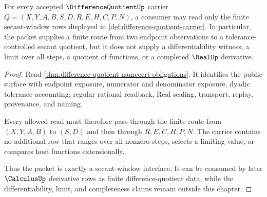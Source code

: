 \begin{theorem}
\label{thm:difference-quotient-finite-window-scope}
For every accepted $\DifferenceQuotientUp$ carrier $Q=(X,Y,A,B,S,D,R,E,H,C,P,N)$, a consumer may read only the finite secant-window rows displayed in \autoref{def:difference-quotient-carrier}. In particular, the packet supplies a finite route from two endpoint observations to a tolerance-controlled secant quotient, but it does not supply a differentiability witness, a limit over all steps, a quotient of functions, or a completed $\RealUp$ derivative.
\end{theorem}
\begin{proof}
Read \autoref{thm:difference-quotient-namecert-obligations}. It identifies the public surface with endpoint exposure, numerator and denominator exposure, dyadic tolerance accounting, regular rational readback, Real sealing, transport, replay, provenance, and naming.

Every allowed read must therefore pass through the finite route from $(X,Y,A,B)$ to $(S,D)$ and then through $R,E,C,H,P,N$. The carrier contains no additional row that ranges over all nonzero steps, selects a limiting value, or compares host functions extensionally.

Thus the packet is exactly a secant-window interface. It can be consumed by later $\CalculusUp$ derivative rows as finite difference-quotient data, while the differentiability, limit, and completeness claims remain outside this chapter.
\end{proof}


\begin{closurestatus}{\DifferenceQuotientUp}
  \theoryclosure{\seedClosure}
  \formalstatus{\unformalizedV}
\end{closurestatus}

